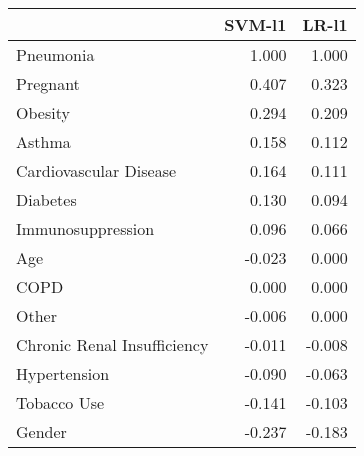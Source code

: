 \begin{tabular}{lrr}
\toprule
{} &  SVM-l1 &  LR-l1 \\
\midrule
Pneumonia                   &   1.000 &  1.000 \\
Pregnant                    &   0.407 &  0.323 \\
Obesity                     &   0.294 &  0.209 \\
Asthma                      &   0.158 &  0.112 \\
Cardiovascular Disease      &   0.164 &  0.111 \\
Diabetes                    &   0.130 &  0.094 \\
Immunosuppression           &   0.096 &  0.066 \\
Age                         &  -0.023 &  0.000 \\
COPD                        &   0.000 &  0.000 \\
Other                       &  -0.006 &  0.000 \\
Chronic Renal Insufficiency &  -0.011 & -0.008 \\
Hypertension                &  -0.090 & -0.063 \\
Tobacco Use                 &  -0.141 & -0.103 \\
Gender                      &  -0.237 & -0.183 \\
\bottomrule
\end{tabular}
